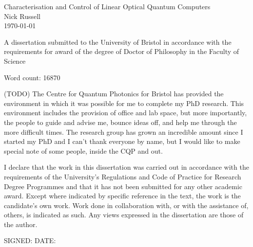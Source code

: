 \begin{titlepage}
  \begin{center}
    {\LARGE Characterisation and Control of Linear Optical Quantum Computers}
\\[1.5cm]
    {\Large Nick Russell}\\[1.5cm]
    {\today}\\[12.0cm]
  \end{center}
  \begin{flushleft}
    {A dissertation submitted to the University of Bristol in accordance with
    the requirements for award of the degree of Doctor of Philosophy in the
    Faculty of Science}
  \end{flushleft}
  \begin{flushright}
    Word count: 16870
  \end{flushright}
\end{titlepage}

\begin{abstract}
  (TODO) Each copy must include an abstract or summary of the dissertation in not more
  than 300 words, on one side of A4, which should be single-spaced in a font
  size in the range 10 to 12.
\end{abstract}

\begin{acknowledgements}
  (TODO) The Centre for Quantum Photonics for Bristol has provided the environment in
  which it was possible for me to complete my PhD research. This environment
  includes the provision of office and lab space, but more importantly, the
  people to guide and advise me, bounce ideas off, and help me through the more
  difficult times. The research group has grown an incredible amount since I
  started my PhD and I can't thank everyone by name, but I would like to make
  special note of some people, inside the CQP and out.
\end{acknowledgements}

\begin{declaration}
  I declare that the work in this dissertation was carried out in accordance
  with the requirements of the University's Regulations and Code of Practice for
  Research Degree Programmes and that it has not been submitted for any other
  academic award. Except where indicated by specific reference in the text, the
  work is the candidate's own work. Work done in collaboration with, or with the
  assistance of, others, is indicated as such. Any views expressed in the
  dissertation are those of the author.

  SIGNED: \dotfill DATE: \dotfill
\end{declaration}

\tableofcontents
\listoffigures


